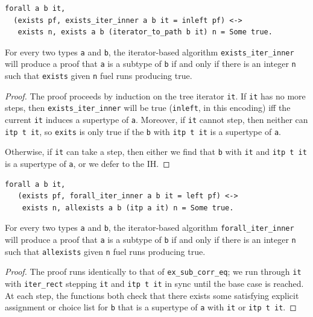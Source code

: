 \documentclass[a4paper,english]{lipics-v2019}
\begin{document}
\begin{lemma}
\label{lem:correxcst}
\begin{small}\begin{verbatim}
forall a b it, 
  (exists pf, exists_iter_inner a b it = inleft pf) <->
   exists n, exists a b (iterator_to_path b it) n = Some true.
\end{verbatim}\end{small}
For every two types \verb|a| and \verb|b|, the iterator-based algorithm
\verb|exists_iter_inner| will produce a proof that \verb|a| is a subtype
of \verb|b| if and only if there is an integer \verb|n| such that
 \verb|exists| given \verb|n| fuel runs producing true.
\end{lemma}
\begin{proof}

The proof proceeds by induction on the tree iterator \verb|it|. If
\verb|it| has no more steps, then \verb|exists_iter_inner| will be true
(\verb|inleft|, in this encoding) iff the current \verb|it| induces a
supertype of \verb|a|. Moreover, if \verb|it| cannot step, then neither can
\verb|itp t it|, so \verb|exits| is only true if the \verb|b| with \verb|itp t it|
is a supertype of \verb|a|. 

Otherwise, if \verb|it| can take a step, then either we find that \verb|b|
with \verb|it| and \verb|itp t it| is a supertype of \verb|a|, or we defer to
the IH.
\end{proof}

\begin{lemma}
\begin{small}\begin{verbatim}
forall a b it,
   (exists pf, forall_iter_inner a b it = left pf) <->
    exists n, allexists a b (itp a it) n = Some true.
\end{verbatim}
\end{small}  
For every two types \verb|a| and \verb|b|, the iterator-based algorithm
\verb|forall_iter_inner| will produce a proof that \verb|a| is a subtype
of \verb|b| if and only if there is an integer \verb|n| such that
 \verb|allexists| given \verb|n| fuel runs producing true.
\end{lemma}
\begin{proof}
The proof runs identically to that of \verb|ex_sub_corr_eq|; we run through
\verb|it| with \verb|iter_rect| stepping \verb|it| and \verb|itp t it| in sync
until the base case is reached. At each step, the functions both check that there
exists some satisfying explicit assignment or choice list for \verb|b| that is a 
supertype of \verb|a| with \verb|it| or \verb|itp t it|. 
\end{proof}
\end{document}
